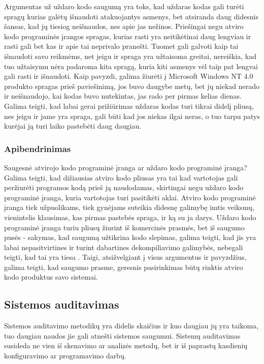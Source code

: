 \documentclass[a4paper,12pt,fleqn]{article}
\begin{document}
Argumentas už uždaro kodo saugumą yra toks, kad uždaras kodas gali turėti spragų kurias galėtų išnaudoti atakuojantys asmenys, bet atsiranda daug didesnis šansas, kad jų tiesiog neišnaudos, nes apie jas nežinos\cite{ford2007open}.  Priešingai negu atviro kodo programinės įrangos spragas, kurias rasti yra neitikėtinai daug lengviau ir rasti gali bet kas ir apie tai neprivalo pranešti. Tuomet gali galvoti kaip tai išnaudoti savo reikmėms, net jeigu ir spraga yra užtaisoma greitai, nereiškia, kad tuo užtaisymu nėra padaroma kita spragą, kuria kiti asmenys vėl taip pat lengvai gali rasti ir išnaudoti. Kaip pavyzdi, galima žiurėti į Microsoft Windows NT 4.0 produkto spragas prieš paviešinimą, jos buvo daugybe metų, bet jų niekad nerado ir neišnaudojo, kai kodas buvo nutekintas, jas rado per pirmas kelias dienas\cite{hoepman2008increased}.  Galima teigti, kad labai gerai prižiūrimas uždaras kodas turi tikrai didelį pliusą, nes jeigu ir jame yra spraga, gali būti kad jos niekas ilgai neras, o tuo tarpu patys kurėjai ją turi laiko pastebėti daug daugiau\cite{schryen2009open}.

\subsubsection{Apibendrinimas}
\label{sec:data}
Saugesnė atvirojo kodo programinė įranga ar uždaro kodo programinė įranga? Galima teigti, kad dižiausias atviro kodo pliusas yra tai kad vartotojas gali peržiurėti programos kodą prieš ją naudodamas, skirtingai negu uždaro kodo programinė įranga, kuria vartotojas turi pasitikėti aklai\cite{Cowan:2003:SSO:858866.859050}. Atviro kodo programinė įranga tiek užpuolikams, tiek gynėjams suteikia didesnę galimybę imtis veiksmų, vienintelis klausimas, kas pirmas pastebės spraga, ir ką su ja darys\cite{mishra2002quality}. Uždaro kodo programinė įranga turiu pliusų žiurint iš komercinės prasmės, bet iš saugumo pusės - sakymas, kad saugumą užtikrina kodo slepimas, galima teigti, kad jis yra labai nepasitvirtines ir turint dabartines dekompiliavimo galimybės, nebegali teigti, kad tai yra tiesa \cite{hoepman2008increased}. Taigi, atsižvelgiant į visus argumentus ir pavyzdžius, galima teigti, kad saugumo prasme, geresnis pasirinkimas būtų rinktis atviro kodo produktus savo sistemai.

\subsection{Sistemos auditavimas}

Sistemos auditavimo metodikų yra didelis skaičius ir kuo daugiau jų yra taikoma, tuo daugiau naudos jie gali atnešti sistemos saugumui. Sistemų auditavimas susideda ne vien iš skenavimo ar analizės metodų, bet ir iš paprastų kasdienių konfiguravimo ar programavimo darbų.
\end{document}

